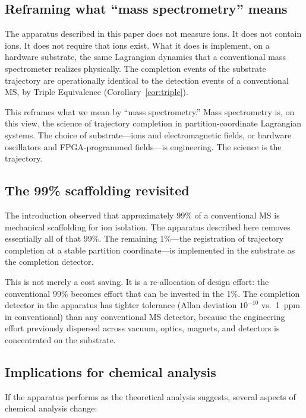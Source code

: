 \documentclass[twocolumn,11pt,a4paper]{article}
\theoremstyle{definition}
\theoremstyle{remark}
\begin{document}
\subsection{Reframing what ``mass spectrometry'' means}

The apparatus described in this paper does not measure ions. It does not contain ions. It does not require that ions exist. What it does is implement, on a hardware substrate, the same Lagrangian dynamics that a conventional mass spectrometer realizes physically. The completion events of the substrate trajectory are operationally identical to the detection events of a conventional MS, by Triple Equivalence (Corollary~\ref{cor:triple}).

This reframes what we mean by ``mass spectrometry.'' Mass spectrometry is, on this view, the science of trajectory completion in partition-coordinate Lagrangian systems. The choice of substrate---ions and electromagnetic fields, or hardware oscillators and FPGA-programmed fields---is engineering. The science is the trajectory.

\subsection{The 99\% scaffolding revisited}

The introduction observed that approximately 99\% of a conventional MS is mechanical scaffolding for ion isolation. The apparatus described here removes essentially all of that 99\%. The remaining 1\%---the registration of trajectory completion at a stable partition coordinate---is implemented in the substrate as the completion detector.

This is not merely a cost saving. It is a re-allocation of design effort: the conventional 99\% becomes effort that can be invested in the 1\%. The completion detector in the apparatus has tighter tolerance (Allan deviation $10^{-10}$ vs.\ \SI{1}{ppm} in conventional) than any conventional MS detector, because the engineering effort previously dispersed across vacuum, optics, magnets, and detectors is concentrated on the substrate.

\subsection{Implications for chemical analysis}

If the apparatus performs as the theoretical analysis suggests, several aspects of chemical analysis change:
\end{document}
